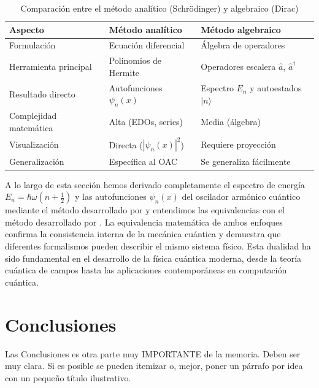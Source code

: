 \documentclass[11pt,a4paper,spanish]{book}
\begin{document}
\begin{table}[h]
	\centering
	\caption{Comparación entre el método analítico (Schrödinger) y algebraico (Dirac)}
	\label{tab:comparacion_metodos}
	\begin{tabular}{p{4cm}p{5cm}p{5cm}}
		\hline
		\textbf{Aspecto} & \textbf{Método analítico} & \textbf{Método algebraico} \\
		\hline
		Formulación & Ecuación diferencial & Álgebra de operadores \\
		Herramienta principal & Polinomios de Hermite & Operadores escalera $\hat{a}$, $\hat{a}^\dagger$ \\
		Resultado directo & Autofunciones $\psi_n(x)$ & Espectro $E_n$ y autoestados $|n\rangle$ \\
		Complejidad matemática & Alta (EDOs, series) & Media (álgebra) \\
		Visualización & Directa ($|\psi_n(x)|^2$) & Requiere proyección \\
		Generalización & Específica al OAC & Se generaliza fácilmente \\
		\hline
	\end{tabular}
\end{table}


A lo largo de esta sección hemos derivado completamente el espectro de energía $E_n = \hbar\omega(n + \frac{1}{2})$ y las autofunciones $\psi_n(x)$ del oscilador armónico cuántico mediante el método desarrollado por \cite{dirac1930} y entendimos las equivalencias con el método desarrollado por \cite{schrodinger1926b}. La equivalencia matemática de ambos enfoques confirma la consistencia interna de la mecánica cuántica y demuestra que diferentes formalismos pueden describir el mismo sistema físico. Esta dualidad ha sido fundamental en el desarrollo de la física cuántica moderna, desde la teoría cuántica de campos hasta las aplicaciones contemporáneas en computación cuántica.
	
	
	\chapter{Conclusiones}
	
	Las Conclusiones es otra parte muy IMPORTANTE de la memoria. Deben ser muy clara. Si es posible se pueden itemizar o, mejor, poner un párrafo por idea con un pequeño título ilustrativo.
	
\end{document}
